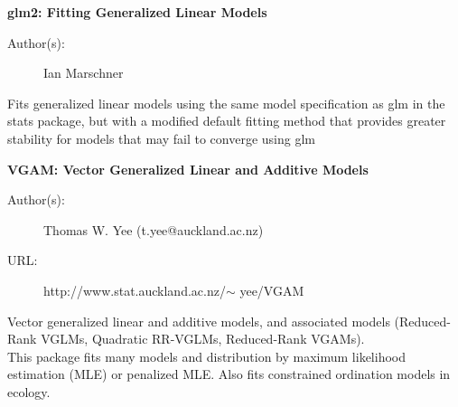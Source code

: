 \documentclass[MASTER.tex]{subfiles}
\begin{document}
\begin{frame}
	\textbf{glm2: Fitting Generalized Linear Models}
\begin{description}
	\item[Author(s):] Ian Marschner 

\end{description}
Fits generalized linear models using the same model specification as glm in the stats package, but with a modified default fitting method that provides greater stability for models that may fail to converge using glm
\end{frame}
\begin{frame}
	\textbf{VGAM: Vector Generalized Linear and Additive Models}
\begin{description}
\item[Author(s):] Thomas W. Yee (t.yee@auckland.ac.nz)
\item[URL:] http://www.stat.auckland.ac.nz/$\sim$ yee/VGAM
\end{description}\bigskip
Vector generalized linear and additive models, and associated models (Reduced-Rank VGLMs, Quadratic RR-VGLMs, Reduced-Rank VGAMs). \\ \bigskip This package fits many models and distribution by maximum likelihood estimation (MLE) or penalized MLE. Also fits constrained ordination models in ecology.
\end{frame}
\end{document}
